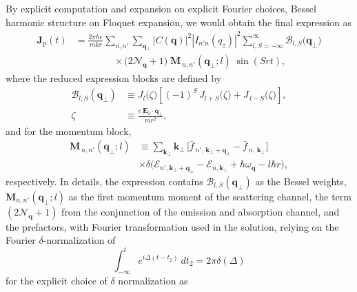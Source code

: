\documentclass[%
 reprint,
 amsmath,amssymb,
 aps,
]{revtex4-2}
\begin{document}
By explicit computation and expansion on explicit Fourier choices, Bessel harmonic structure on Floquet expansion, we would obtain the final expression as
\begin{equation}
\begin{split}
\mathbf{J}_{\mathrm p}(t)
&=
\frac{2\pi\hbar e}{m k r}
\sum_{n,n'}
\sum_{\mathbf{q}_{\perp}}
\left|C(\mathbf q)\right|^2
\left|I_{n'n}(q_z)\right|^2
\sum_{l,S=-\infty}^{\infty}
\mathcal{B}_{l,S}\!\big(\mathbf q_{\perp}\big)
\\
&\qquad\qquad\times
\big(2\mathcal N_{\mathbf q}+1\big)
\;
\mathbf{M}_{\,n,n'}(\mathbf q_{\perp};l)\;
\sin(S r t),
\end{split}
\end{equation}
where the reduced expression blocks are defined by
\begin{equation}
\begin{split}
    \mathcal{B}_{l,S}(\mathbf q_{\perp})
&\equiv
J_{l}\!\big(\zeta\big)
\left[
(-1)^{S}\,J_{l+S}\!\big(\zeta\big)
+
J_{\,l-S}\!\big(\zeta\big)
\right],\\
\zeta& \equiv \frac{e\,\mathbf{E}_0\!\cdot\!\mathbf q_{\perp}}{m r^2},
\end{split}
\end{equation}
and for the momentum block,
\begin{equation}
\begin{split}
    \mathbf{M}_{\,n,n'}(\mathbf q_{\perp};l)
&\equiv
\sum_{\mathbf{k}_{\perp}}
\mathbf{k}_{\perp}\,
\big[
\bar f_{\,n',\,\mathbf{k}_{\perp}+\mathbf q_{\perp}}
-
\bar f_{\,n,\,\mathbf{k}_{\perp}}
\big]\\
&\times
\delta\!\big(\mathcal{E}_{n',\mathbf{k}_{\perp}+\mathbf q_{\perp}}
-
\mathcal{E}_{n,\mathbf{k}_{\perp}}
+
\hbar\omega_{\mathbf q}
-
l\hbar r\big),
\end{split}
\end{equation}
respectively. In details, the expression contains $\mathcal{B}_{l,S}(\mathbf{q}_{\perp})$ as the Bessel weights, $\mathbf{M}_{n,n'}(\mathbf{q}_{\perp};l)$ as the first momentum moment of the scattering channel, the term $(2\mathcal{N}_{\mathbf{q}}+1)$ from the conjunction of the emission and absorption channel, and the prefactors, with Fourier transformation used in the solution, relying on the Fourier $\delta$-normalization of
\begin{equation}
    \int_{-\infty}^{t} e^{i\Delta(t-t_{2})}\:dt_{2} = 2\pi\delta(\Delta)
\end{equation}
for the explicit choice of $\delta$ normalization as
\end{document}
